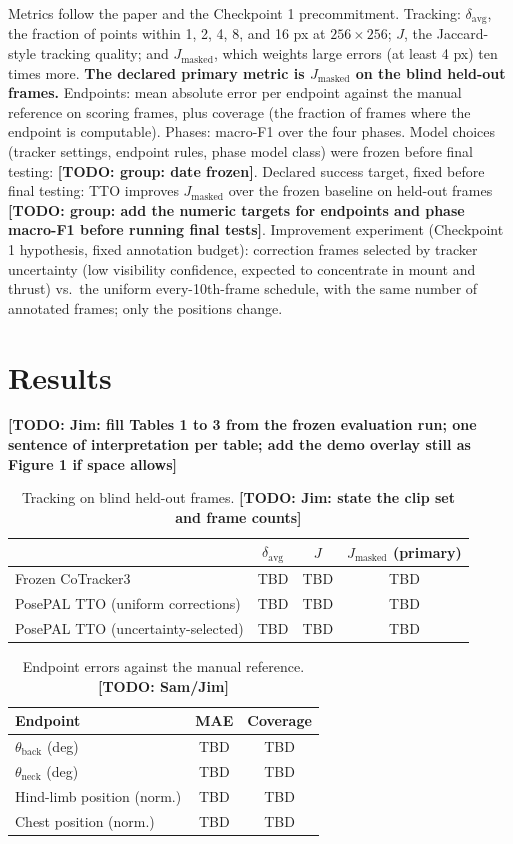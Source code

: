 \documentclass[11pt]{article}
\newcommand{\todo}[1]{\textbf{[TODO: #1]}}
\begin{document}
Metrics follow the paper and the Checkpoint 1 precommitment. Tracking:
$\delta_{\text{avg}}$, the fraction of points within 1, 2, 4, 8, and 16
px at $256 \times 256$; $J$, the Jaccard-style tracking quality; and
$J_{\text{masked}}$, which weights large errors (at least 4 px) ten
times more. \textbf{The declared primary metric is $J_{\text{masked}}$
on the blind held-out frames.} Endpoints: mean absolute error per
endpoint against the manual reference on scoring frames, plus coverage
(the fraction of frames where the endpoint is computable). Phases:
macro-F1 over the four phases. Model choices (tracker settings,
endpoint rules, phase model class) were frozen before final testing:
\todo{group: date frozen}. Declared success target, fixed before final
testing: TTO improves $J_{\text{masked}}$ over the frozen baseline on
held-out frames \todo{group: add the numeric targets for endpoints and
phase macro-F1 before running final tests}. Improvement experiment
(Checkpoint 1 hypothesis, fixed annotation budget): correction frames
selected by tracker uncertainty (low visibility confidence, expected
to concentrate in mount and thrust) vs.\ the uniform every-10th-frame
schedule, with the same number of annotated frames; only the positions
change.

\section{Results}

\todo{Jim: fill Tables 1 to 3 from the frozen evaluation run; one
sentence of interpretation per table; add the demo overlay still as
Figure 1 if space allows}

\begin{table}[h]
\centering\small
\begin{tabular}{lccc}
\toprule
 & $\delta_{\text{avg}}$ & $J$ & $J_{\text{masked}}$ (primary)\\
\midrule
Frozen CoTracker3 & TBD & TBD & TBD\\
PosePAL TTO (uniform corrections) & TBD & TBD & TBD\\
PosePAL TTO (uncertainty-selected) & TBD & TBD & TBD\\
\bottomrule
\end{tabular}
\caption{Tracking on blind held-out frames. \todo{Jim: state the clip
set and frame counts}}
\end{table}

\begin{table}[h]
\centering\small
\begin{tabular}{lcc}
\toprule
Endpoint & MAE & Coverage\\
\midrule
$\theta_{\text{back}}$ (deg) & TBD & TBD\\
$\theta_{\text{neck}}$ (deg) & TBD & TBD\\
Hind-limb position (norm.) & TBD & TBD\\
Chest position (norm.) & TBD & TBD\\
\bottomrule
\end{tabular}
\caption{Endpoint errors against the manual reference. \todo{Sam/Jim}}
\end{table}
\end{document}
